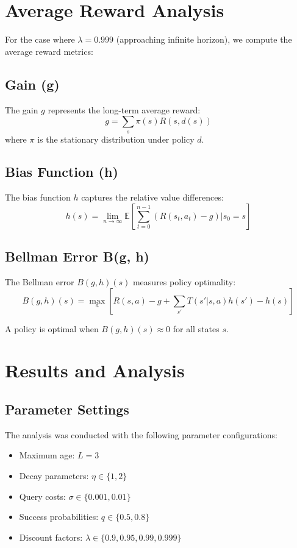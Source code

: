 \documentclass[12pt]{article}
\begin{document}
\section{Average Reward Analysis}

For the case where $\lambda = 0.999$ (approaching infinite horizon), we compute the average reward metrics:

\subsection{Gain (g)}
The gain $g$ represents the long-term average reward:
$$g = \sum_{s} \pi(s) R(s, d(s))$$
where $\pi$ is the stationary distribution under policy $d$.

\subsection{Bias Function (h)}
The bias function $h$ captures the relative value differences:
$$h(s) = \lim_{n \to \infty} \mathbb{E}\left[\sum_{t=0}^{n-1} (R(s_t, a_t) - g) | s_0 = s\right]$$

\subsection{Bellman Error B(g, h)}
The Bellman error $B(g, h)(s)$ measures policy optimality:
$$B(g, h)(s) = \max_a \left[ R(s, a) - g + \sum_{s'} T(s'|s, a) h(s') - h(s) \right]$$

A policy is optimal when $B(g, h)(s) \approx 0$ for all states $s$.

\section{Results and Analysis}

\subsection{Parameter Settings}
The analysis was conducted with the following parameter configurations:
\begin{itemize}
    \item Maximum age: $L = 3$
    \item Decay parameters: $\eta \in \{1, 2\}$
    \item Query costs: $\sigma \in \{0.001, 0.01\}$
    \item Success probabilities: $q \in \{0.5, 0.8\}$
    \item Discount factors: $\lambda \in \{0.9, 0.95, 0.99, 0.999\}$
\end{itemize}
\end{document}
